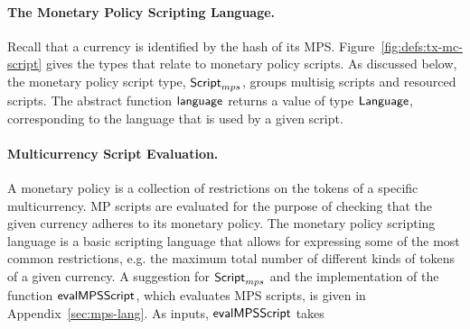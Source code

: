 \begin{figure*}[t!]
\end{figure*}

\paragraph*{The Monetary Policy Scripting Language.}
Recall that a currency is identified by the hash of its MPS.
Figure~\ref{fig:defs:tx-mc-script} gives the types that relate to monetary
policy scripts. %
As discussed below, the monetary policy script type, $\mathsf{Script}_{mps}$, groups multisig scripts
and resourced scripts.
The abstract
function $\mathsf{language}$ returns a value of type $\mathsf{Language}$,
corresponding to the language that is used by a given script.

\paragraph*{Multicurrency Script Evaluation.}
A monetary policy is a collection of restrictions on the tokens of a
specific multicurrency. MP scripts are evaluated for the purpose of checking that
the given currency adheres to its monetary policy. The monetary policy scripting
language is a basic scripting language that
allows for expressing some of the most common restrictions, e.g.
the maximum total number of different kinds of tokens of a given currency.
A suggestion for $\mathsf{Script}_{mps}$ and the implementation of the function
$\mathsf{evalMPSScript}$, which evaluates MPS scripts, is given in
Appendix~\ref{sec:mps-lang}. As inputs, $\mathsf{evalMPSScript}$ takes

